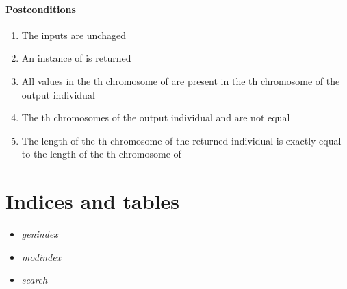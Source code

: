 \documentclass[letterpaper,10pt,english]{sphinxmanual}
\begin{document}
\subsubsection{Postconditions}
\label{contracts:id46}\begin{enumerate}
\item {} 
The inputs are unchaged

\item {} 
An instance of  is returned

\item {} 
All values in the  th chromosome of  are present in the  th chromosome of the output individual

\item {} 
The  th chromosomes of the output individual and  are not equal

\item {} 
The length of the  th chromosome of the returned individual is exactly equal to the length of the  th chromosome of 

\end{enumerate}


\chapter{Indices and tables}
\label{index:indices-and-tables}\begin{itemize}
\item {} 
\emph{genindex}

\item {} 
\emph{modindex}

\item {} 
\emph{search}

\end{itemize}



\renewcommand{\indexname}{Index}
\printindex
\end{document}
